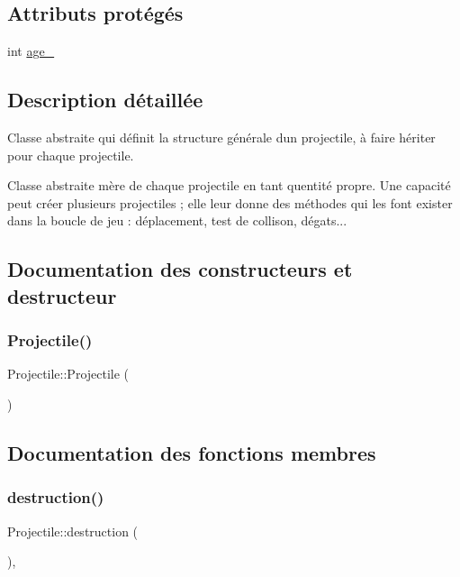 \subsection*{Attributs protégés}
\begin{DoxyCompactItemize}
\item 
int \hyperlink{class_projectile_a1f0a231e002d4796c32ccfeb36c887b1}{age\+\_\+}
\end{DoxyCompactItemize}


\subsection{Description détaillée}
Classe abstraite qui définit la structure générale d\textquotesingle{}un projectile, à faire hériter pour chaque projectile. 

Classe abstraite mère de chaque projectile en tant qu\textquotesingle{}entité propre. Une capacité peut créer plusieurs projectiles ; elle leur donne des méthodes qui les font exister dans la boucle de jeu \+: déplacement, test de collison, dégats... 

\subsection{Documentation des constructeurs et destructeur}
\mbox{\label{class_projectile_ac536ed2aad56af866a2078b9a85aa16d}} 
\subsubsection{\texorpdfstring{Projectile()}{Projectile()}}
{\footnotesize\ttfamily Projectile\+::\+Projectile (\begin{DoxyParamCaption}{ }\end{DoxyParamCaption})}



\subsection{Documentation des fonctions membres}
\mbox{\label{class_projectile_aac0afd5bf761f0e212d4e1c8a503c86a}} 
\subsubsection{\texorpdfstring{destruction()}{destruction()}}
{\footnotesize\ttfamily Projectile\+::destruction (\begin{DoxyParamCaption}{ }\end{DoxyParamCaption})\hspace{0.3cm}{\ttfamily [inline]}, {\ttfamily [virtual]}}



